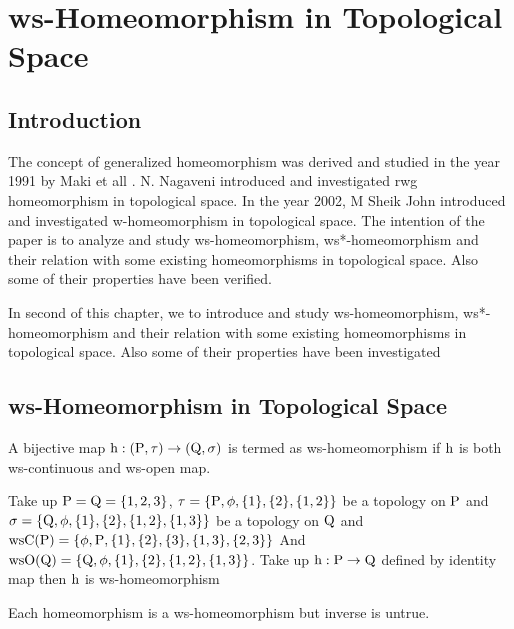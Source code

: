 \chapter{ws-Homeomorphism in Topological Space}
\graphicspath{{Chapter5/Chapter5Figs/EPS/}{Chapter5/Chapter5Figs/}}

\section{Introduction}\label{sec5.1}

The concept of generalized homeomorphism was derived and studied in the year 1991 by Maki et all \cite{Maki5}. N. Nagaveni \cite{Nagaveni5} introduced and investigated rwg homeomorphism in topological space. In the year 2002, M Sheik John \cite{Sheik1} introduced and investigated w-homeomorphism in topological space. The intention of the paper is to analyze and study ws-homeomorphism, ws*-homeomorphism and their relation with some existing homeomorphisms in topological space. Also some of their properties have been verified.

In second of this chapter, we to introduce and study ws-homeomorphism, ws*-homeomorphism and their relation with some existing homeomorphisms in topological space. Also some of their properties have been investigated

\section{ws-Homeomorphism in Topological Space}\label{sec5.2}

\begin{dfn}\label{defi5.2.1}
A bijective map $\mathrm{h}: (\mathrm{P},\tau)\to (\mathrm{Q},\sigma)$ is termed as ws-homeomor\-phism if $\mathrm{h}$ is both ws-continuous and ws-open map.
\end{dfn}

\begin{exm}\label{exam5.2.2} 
Take up $\mathrm{P}=\mathrm{Q}=\{1,2,3\}$, $\tau =\{\mathrm{P}, \phi,\{1\},\{2\},\{1,2\}\}$ be a topology on $\mathrm{P}$ and $\sigma =\{\mathrm{Q},\phi,\{1\},\{2\},\{1,2\},\{1,3\}\}$ be a topology on $\mathrm{Q}$ and $\mathrm{ws}\mathrm{C}(\mathrm{P})= \{\phi, \mathrm{P}, \{1\}, \{2\},\{3\}, \{1, 3\},\{2, 3\}\}$ And $\mathrm{ws}\mathrm{O}(\mathrm{Q}) =\{\mathrm{Q}, \phi,\{1\},\{2\},\{1,2\},\{1,3\}\}$. Take up $\mathrm{h}: \mathrm{P}\to \mathrm{Q}$ defined by identity map then $\mathrm{h}$ is ws-homeomorphism 
\end{exm}

\begin{thm}\label{thm5.2.3}
Each homeomorphism is a ws-homeomorphism but inverse is untrue.
\end{thm}

